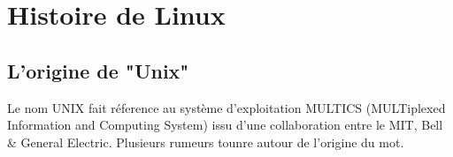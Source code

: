 \newpage
\section{Histoire de Linux}
\subsection{L'origine de "Unix"}
Le nom UNIX fait réference au syst\`eme d'exploitation MULTICS (MULTiplexed
Information and Computing System) issu d'une collaboration entre le MIT, Bell
\& General Electric.
Plusieurs rumeurs tounre autour de l'origine du mot.\\
